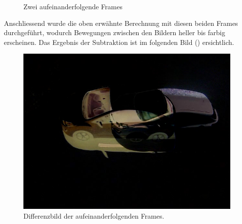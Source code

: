 \begin{figure}[H]
  \centering
  \caption{Zwei aufeinanderfolgende Frames}
  \label{bFrames}
\end{figure}

Anschliessend wurde die oben erwähnte Berechnung mit diesen beiden Frames durchgeführt, wodurch Bewegungen zwischen den Bildern heller bis farbig erscheinen. Das Ergebnis der Subtraktion ist im folgenden Bild () ersichtlich.

\begin{figure}[H]
  \centering
  \includegraphics[height=0.3\textheight]{Software/Blur1.jpg} 
  \caption{Differenzbild der aufeinanderfolgenden Frames.}
  \label{bBlur1}
\end{figure} 

